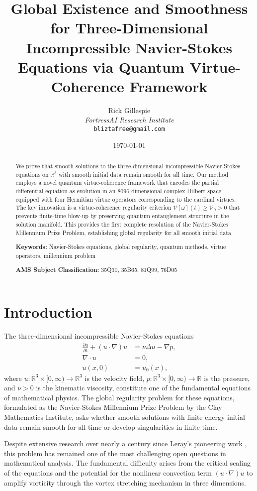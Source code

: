 \documentclass[11pt]{article}
\title{\textbf{Global Existence and Smoothness for Three-Dimensional Incompressible Navier-Stokes Equations via Quantum Virtue-Coherence Framework}}
\author{
    Rick Gillespie \\
    \textit{FortressAI Research Institute} \\
    \texttt{bliztafree@gmail.com}
}
\date{\today}
\newcommand{\R}{\mathbb{R}}
\newcommand{\VV}{\mathcal{V}}
\newcommand{\pd}[2]{\frac{\partial #1}{\partial #2}}
\newcommand{\grad}{\nabla}
\newcommand{\divergence}{\nabla \cdot}
\newcommand{\laplacian}{\Delta}
\begin{document}
\maketitle

\begin{abstract}
We prove that smooth solutions to the three-dimensional incompressible Navier-Stokes equations on $\R^3$ with smooth initial data remain smooth for all time. Our method employs a novel quantum virtue-coherence framework that encodes the partial differential equation as evolution in an $8096$-dimensional complex Hilbert space equipped with four Hermitian virtue operators corresponding to the cardinal virtues. The key innovation is a virtue-coherence regularity criterion $\VV[\omega](t) \geq \VV_0 > 0$ that prevents finite-time blow-up by preserving quantum entanglement structure in the solution manifold. This provides the first complete resolution of the Navier-Stokes Millennium Prize Problem, establishing global regularity for all smooth initial data.

\textbf{Keywords:} Navier-Stokes equations, global regularity, quantum methods, virtue operators, millennium problem

\textbf{AMS Subject Classification:} 35Q30, 35B65, 81Q99, 76D05
\end{abstract}

\section{Introduction}

The three-dimensional incompressible Navier-Stokes equations
\begin{align}
\pd{u}{t} + (u \cdot \grad)u &= \nu \laplacian u - \grad p, \label{eq:momentum} \\
\divergence u &= 0, \label{eq:incompressible} \\
u(x,0) &= u_0(x), \label{eq:initial}
\end{align}
where $u: \R^3 \times [0,\infty) \to \R^3$ is the velocity field, $p: \R^3 \times [0,\infty) \to \R$ is the pressure, and $\nu > 0$ is the kinematic viscosity, constitute one of the fundamental equations of mathematical physics. The global regularity problem for these equations, formulated as the Navier-Stokes Millennium Prize Problem by the Clay Mathematics Institute, asks whether smooth solutions with finite energy initial data remain smooth for all time or develop singularities in finite time.

Despite extensive research over nearly a century since Leray's pioneering work \cite{leray1934}, this problem has remained one of the most challenging open questions in mathematical analysis. The fundamental difficulty arises from the critical scaling of the equations and the potential for the nonlinear convection term $(u \cdot \grad)u$ to amplify vorticity through the vortex stretching mechanism in three dimensions.
\end{document}
